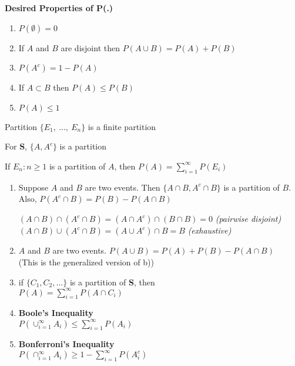 \documentclass[14pt, oneside, letterpaper]{notes}
\begin{document}
\begin{remark}
\textbf{Desired Properties of P(.)}
\begin{enumerate}
	\item $P(\emptyset) = 0$
	\item If $A$ and $B$ are disjoint then $P(A \cup B) = P(A) + P(B)$
	\item $P(A^c) = 1- P(A)$
	\item If $A \subset B$ then $P(A) \leq P(B)$
	\item $P(A) \leq 1$
\end{enumerate}
\end{remark}

%
%

\begin{remark}
	Partition $\{E_1, \: ..., \: E_n \}$ is a finite partition
\end{remark}

\begin{remark}
	For \textbf{S}, $\{A, A^c\}$ is a partition
\end{remark}

\begin{remark}
	If $E_n: n \geq 1$ is a partition of $A$, then $P(A) = \sum_{i=1}^{\infty} P(E_i)$
\end{remark}

\begin{enumerate}
	\item Suppose $A$ and $B$ are two events.  Then $\{A \cap B, A^c \cap B\}$
	is a partition of $B$.  Also, $P(A^c \cap B) = P(B) - P(A \cap B)$ 

	\begin{myproof}
		$(A \cap B) \cap (A^c \cap B) = 
		(A \cap A^c) \cap (B \cap B) = 0$  \textit{(pairwise disjoint)} \\
		$(A \cap B) \cup (A^c \cap B) = (A \cup A^c) \cap B = B $ 
		\textit{(exhaustive)} 
	\end{myproof}

	\item $A$ and $B$ are two events.  $P(A \cup B) = P(A) + P(B) - P(A \cap B)$ \\
	(This is the generalized version of b)) 

	\item if $\{C_1, C_2, ... \}$ is a partition of \textbf{S}, then \\
	$P(A) = \sum_{i=1}^{\infty} P(A \cap C_i)$ 

	\item\textbf{Boole's Inequality} \\
	\indent $P(\cup_{i=1}^{\infty} A_i) \leq \sum_{i=1}^{\infty}P(A_i)$ 
	
	\item \textbf{Bonferroni's Inequality}\\
	$P(\cap_{i=1}^{\infty} A_i) \geq 1 - \sum_{i=1}^{\infty} P(A_i^c)$
\end{enumerate}
\end{document}
